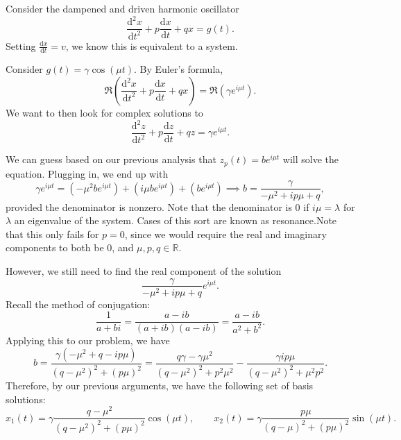 Consider the dampened and driven harmonic oscillator
\[
	\frac{\mathrm{d}^2x}{\mathrm{d}t^2} +p \frac{\mathrm{d}x}{\mathrm{d}t} +qx=g(t)
.\]
Setting $\frac{\mathrm{d}x}{\mathrm{d}t} =v$, we know this is equivalent to a system.

Consider $g(t)=\gamma \cos (\mu t)$. By Euler's formula,
\[
	\Re \left( \frac{\mathrm{d}^2x}{\mathrm{d}t^2} +p \frac{\mathrm{d}x}{\mathrm{d}t} +qx \right) =\Re \left( \gamma e^{i\mu t} \right) 
.\]
We want to then look for complex solutions to
\[
	\frac{\mathrm{d}^2z}{\mathrm{d}t^2} +p \frac{\mathrm{d}z}{\mathrm{d}t} +qz=\gamma e^{i\mu t}
.\]

We can guess based on our previous analysis that $z_p(t)=be^{i\mu t}$ will solve the equation. Plugging in, we end up with
\[
	\gamma e^{i\mu t}=\left( -\mu ^2be^{i\mu t} \right) +\left( i\mu be^{i\mu t} \right) +\left( be^{i\mu t} \right) \implies b=\frac{\gamma }{-\mu ^2+ip\mu +q}
,\]
provided the denominator is nonzero. Note that the denominator is $0$ if $i\mu =\lambda $ for $\lambda $ an eigenvalue of the system. Cases of this sort are known as resonance.Note that this only fails for $p=0$, since we would require the real and imaginary components to both be $0$, and $\mu ,p,q\in\mathbb{R}$.

However, we still need to find the real component of the solution
\[
	\frac{\gamma }{-\mu ^2+ip\mu +q}e^{i\mu t}
.\]
Recall the method of conjugation:
\[
	\frac{1}{a+bi}=\frac{a-ib}{\left( a+ib \right) \left( a-ib \right) }=\frac{a-ib}{a^2+b^2}
.\]
Applying this to our problem, we have
\[
	b=\frac{\gamma \left( -\mu ^2+q-ip\mu  \right) }{\left( q-\mu^2 \right) ^2+\left( p\mu  \right) ^2}=\frac{q\gamma -\gamma \mu ^2}{\left( q-\mu ^2 \right) ^2+p^2\mu ^2}-\frac{\gamma ip\mu }{\left( q-\mu ^2 \right) ^2+\mu ^2p^2}
.\]
Therefore, by our previous arguments, we have the following set of basis solutions:
\[
	x_1(t)=\gamma \frac{q-\mu ^2}{\left( q-\mu ^2 \right) ^2+\left( p\mu  \right) ^2}\cos (\mu t),\qquad x_2(t)=\gamma \frac{p\mu }{\left( q-\mu  \right) ^2+\left( p\mu  \right) ^2}\sin \left( \mu t \right) 
.\]

